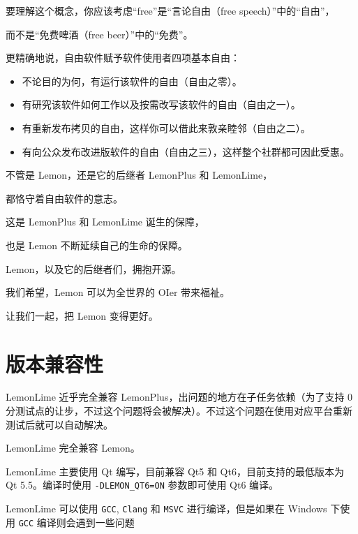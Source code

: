 \documentclass[UTF-8]{ctexart}
\begin{document}
		要理解这个概念，你应该考虑“free”是“言论自由（free speech）”中的“自由”，

		而不是“免费啤酒（free beer）”中的“免费”。\newline

		更精确地说，自由软件赋予软件使用者四项基本自由：

		\begin{itemize}
			\item 不论目的为何，有运行该软件的自由（自由之零）。
			\item 有研究该软件如何工作以及按需改写该软件的自由（自由之一）。
			\item 有重新发布拷贝的自由，这样你可以借此来敦亲睦邻（自由之二）。
			\item 有向公众发布改进版软件的自由（自由之三），这样整个社群都可因此受惠。
		\end{itemize}

		不管是 Lemon，还是它的后继者 LemonPlus 和 LemonLime，

		都恪守着自由软件的意志。

		这是 LemonPlus 和 LemonLime 诞生的保障，

		也是 Lemon 不断延续自己的生命的保障。\newline

		\begin{center}

		Lemon，以及它的后继者们，拥抱开源。

		我们希望，Lemon 可以为全世界的 OIer 带来福祉。

		让我们一起，把 Lemon 变得更好。

		\end{center}

	\newpage

	\section{版本兼容性}

		LemonLime 近乎完全兼容 LemonPlus，出问题的地方在子任务依赖（为了支持 0 分测试点的让步，不过这个问题将会被解决）。不过这个问题在使用对应平台重新测试后就可以自动解决。

		LemonLime 完全兼容 Lemon。

		LemonLime 主要使用 Qt 编写，目前兼容 Qt5 和 Qt6，目前支持的最低版本为 Qt 5.5。编译时使用 \verb|-DLEMON_QT6=ON| 参数即可使用 Qt6 编译。

		LemonLime 可以使用 \texttt{GCC}, \texttt{Clang} 和 \texttt{MSVC} 进行编译，但是如果在 Windows 下使用 \texttt{GCC} 编译则会遇到一些问题
\end{document}
